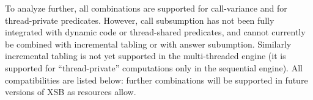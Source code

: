 To analyze further, all combinations are supported for call-variance
and for thread-private predicates.  However, call subsumption has not
been fully integrated with dynamic code or thread-shared predicates,
and cannot currently be combined with incremental tabling or with
answer subumption.  Similarly incremental tabling is not yet supported
in the multi-threaded engine (it is supported for ``thread-private''
computations only in the sequential engine).  All compatibilities are
listed below: further combinations will be supported in future
versions of XSB as resources allow.


